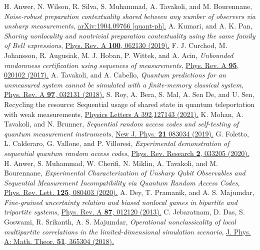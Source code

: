 \documentclass[pra,a4paper,aps,twocolumn,showpacs,superscriptaddress,groupedaddress]{revtex4}
\begin{document}
\begin{thebibliography}{1}
 H. Anwer, N. Wilson, R. Silva, S. Muhammad, A. Tavakoli, and M. Bourennane, \emph{Noise-robust preparation contextuality shared between any number of observers via unsharp measurements}, \href{https://arxiv.org/abs/1904.09766}{arXiv:1904.09766 [quant-ph].}
 A. Kumari, and A. K. Pan, \emph{Sharing nonlocality and nontrivial preparation contextuality using the same family of Bell expressions}, \href{https://journals.aps.org/pra/abstract/10.1103/PhysRevA.100.062130}{Phys. Rev. A {\bf 100}, 062130 (2019).}
 F. J. Curchod, M. Johansson, R. Augusiak, M. J. Hoban, P.  Wittek, and A. Acin, \emph{Unbounded randomness certification using sequences of measurements}, \href{https://journals.aps.org/pra/abstract/10.1103/PhysRevA.95.020102}{Phys. Rev. A {\bf 95}, 020102 (2017).}
 A. Tavakoli, and A. Cabello, \emph{Quantum predictions for an unmeasured system cannot be simulated with a finite-memory classical system}, \href{https://journals.aps.org/pra/abstract/10.1103/PhysRevA.97.032131}{Phys. Rev. A {\bf 97}, 032131 (2018).}
 S. Roy, A. Bera, S. Mal, A. Sen De, and U. Sen, Recycling the resource: Sequential usage of shared state in quantum teleportation with weak measurements, \href{https://www.sciencedirect.com/science/article/abs/pii/S0375960121000074}{Physics Letters A 392,127143 (2021).}
 K. Mohan, A. Tavakoli, and N. Brunner, \emph{Sequential random access codes and self-testing of quantum measurement instruments}, \href{https://doi.org/10.1088/1367-2630/ab3773}{New J. Phys. {\bf 21} 083034 (2019).}
 G. Foletto, L. Calderaro, G. Vallone, and P. Villoresi, \emph{Experimental demonstration of sequential quantum random access codes}, \href{https://journals.aps.org/prresearch/abstract/10.1103/PhysRevResearch.2.033205}{Phys. Rev. Research {\bf 2}, 033205 (2020).}
 H. Anwer, S. Muhammad, W. Cherifi, N. Miklin, A. Tavakoli, and M. Bourennane, \emph{Experimental Characterization of Unsharp Qubit Observables and Sequential Measurement Incompatibility via Quantum Random Access Codes}, \href{https://journals.aps.org/prl/abstract/10.1103/PhysRevLett.125.080403}{Phys. Rev. Lett. {\bf 125}, 080403 (2020).}
 A. Dey, T. Pramanik, and A. S. Majumdar, \emph{Fine-grained uncertainty relation and biased nonlocal games in bipartite and tripartite systems},  \href{https://journals.aps.org/pra/abstract/10.1103/PhysRevA.87.012120}{Phys. Rev. A {\bf  87}, 012120 (2013).}
 C. Jebaratnam, D. Das, S. Goswami, R. Srikanth, A. S. Majumdar, \emph{Operational nonclassicality of local multipartite correlations in the limited-dimensional simulation scenario}, \href{https://iopscience.iop.org/article/10.1088/1751-8121/aad1fd}{J. Phys. A: Math. Theor. {\bf 51}, 365304 (2018).}

\end{thebibliography}
\end{document}
